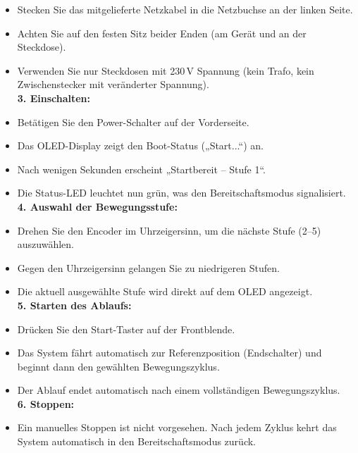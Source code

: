 \documentclass[a4paper,12pt]{report}
\begin{document}
\begin{itemize}[leftmargin=1.5em]
		\item Stecken Sie das mitgelieferte Netzkabel in die Netzbuchse an der linken Seite. 
		\item Achten Sie auf den festen Sitz beider Enden (am Gerät und an der Steckdose). 
		\item Verwenden Sie nur Steckdosen mit 230 V Spannung (kein Trafo, kein Zwischenstecker mit veränderter Spannung). \\
		
		\textbf{3. Einschalten:}
		
		\item Betätigen Sie den Power-Schalter auf der Vorderseite. 
		\item Das OLED-Display zeigt den Boot-Status („Start...“) an. 
		\item Nach wenigen Sekunden erscheint „Startbereit – Stufe 1“. 
		\item Die Status-LED leuchtet nun grün, was den Bereitschaftsmodus signalisiert. \\
		
		\textbf{4. Auswahl der Bewegungsstufe:}
		
		\item Drehen Sie den Encoder im Uhrzeigersinn, um die nächste Stufe (2–5) auszuwählen. 
		\item Gegen den Uhrzeigersinn gelangen Sie zu niedrigeren Stufen. 
		\item Die aktuell ausgewählte Stufe wird direkt auf dem OLED angezeigt. \\
		
		\textbf{5. Starten des Ablaufs:}
		
		\item Drücken Sie den Start-Taster auf der Frontblende. 
		\item Das System fährt automatisch zur Referenzposition (Endschalter) und beginnt dann den gewählten Bewegungszyklus. 
		\item Der Ablauf endet automatisch nach einem vollständigen Bewegungszyklus. \\
		
		\textbf{6. Stoppen:}
		
		\item Ein manuelles Stoppen ist nicht vorgesehen. Nach jedem Zyklus kehrt das System automatisch in den Bereitschaftsmodus zurück. \\
		
	\end{itemize}
	
\end{document}
